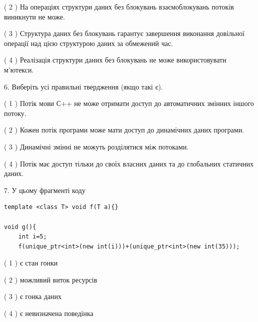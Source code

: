 \documentclass[12pt, ukrainian]{article}
\begin{document}
\begin {large}
{( 2 ) На операціях структури даних без блокувань взаємоблокувань потоків виникнути не може.%

( 3 ) Структура даних без блокувань гарантує завершення виконання довільної операції над цією структурою даних за обмежений час.%

( 4 ) Реалізація структури даних без блокувань не може використовувати м’ютекси.%
\newpage



\vspace{5mm}
6. Виберіть усі правильні твердження (якщо такі є).\par
\vspace{2mm}

( 1 ) Потік мови С++ не може отримати доступ до автоматичних змінних іншого потоку.%

( 2 ) Кожен потік програми може мати доступ до динамічних даних програми.%

( 3 ) Динамічні змінні не можуть розділятися між потоками.%

( 4 ) Потік має доступ тільки до своїх власних даних та до глобальних статичних даних.%


\vspace{5mm}
7. У цьому фрагменті коду
\begin{verbatim}
template <class T> void f(T a){}

void g(){
    int i=5;
    f(unique_ptr<int>(new int(i)))+(unique_ptr<int>(new int(35)));
\end{verbatim}
( 1 ) є стан гонки%

( 2 ) можливий виток ресурсів%

( 3 ) є гонка даних%

( 4 ) є невизначена поведінка%
}
\end {large}
\end{document}
